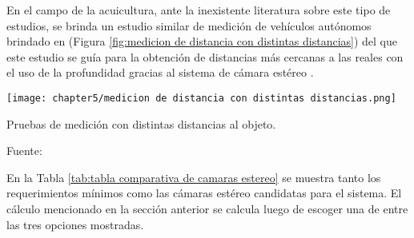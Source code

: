 En el campo de la acuicultura, ante la inexistente literatura sobre este tipo de estudios, se brinda un estudio similar de medición de vehículos autónomos brindado en \cite{Zaarane2020} (Figura \ref{fig:medicion de distancia con distintas distancias}) del que este estudio se guía para la obtención de distancias más cercanas a las reales con el uso de la profundidad gracias al sistema de cámara estéreo .

\begin{myfigure}[H]
	\footnotesize\centering
	\texttt{[image: chapter5/medicion de distancia con distintas distancias.png]}
	\caption{Pruebas de medición con distintas distancias al objeto.}
	\begin{myflushcenter}
		Fuente: \cite{Zaarane2020}
	\end{myflushcenter}
	\label{fig:medicion de distancia con distintas distancias}
\end{myfigure}
	

En la Tabla \ref{tab:tabla comparativa de camaras estereo} se muestra tanto los requerimientos mínimos como las cámaras estéreo candidatas para el sistema. El cálculo mencionado en la sección anterior se calcula luego de escoger una de entre las tres opciones mostradas.


